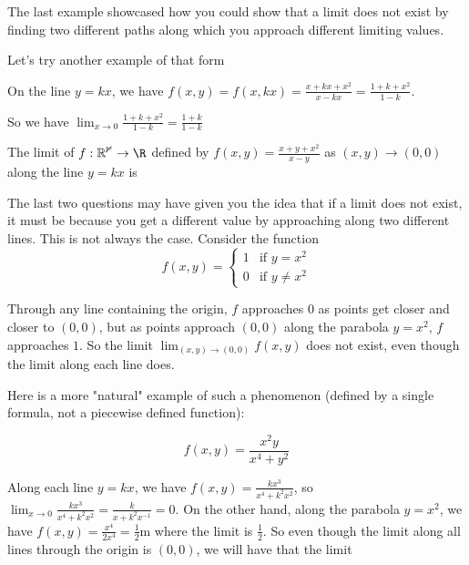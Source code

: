 \documentclass{ximera}
\begin{document}
	The last example showcased how you could show that a limit does not exist by finding two different paths along which you approach different limiting values.  
	
	Let's try another example of that form
	
	\begin{question}
		
	\begin{solution}
	\begin{hint}
		On the line $y=kx$, we have $f(x,y) = f(x,kx) = \frac{x+kx+x^2}{x-kx}  = \frac{1+k+x^2}{1-k }$.
	\end{hint}
	\begin{hint}
		So we have  $\lim_{x \to 0} \frac{1+k+x^2}{1-k} = \frac{1+k}{1-k}$ 
	\end{hint}
		The limit of $f: \mathbb{R^2} \to \R$ defined by $f(x,y) = \frac{x+y+x^2}{x-y}$ as $(x,y) \to (0,0)$ along the line $y=kx$ is 
	\end{solution}		
	\end{question}
	
	The last two questions may have given you the idea that if a limit does not exist, it must be because you get a different value by approaching along two different lines.  
	This is not always the case.  Consider the function
	\[f(x,y) = \begin{cases}
			1 & \text{if $y = x^2$}\\
			0 & \text{if $y \neq x^2$}
		 \end{cases}\]
		 
	Through any line containing the origin, $f$ approaches $0$ as points get closer and closer to $(0,0)$, but as points approach $(0,0)$ along the parabola 
	$y=x^2$, $f$ approaches $1$.  So the limit $\lim_{(x,y) \to (0,0)} f(x,y)$ does not exist, even though the limit along each line does.
	
	Here is a more "natural" example of such a phenomenon (defined by a single formula, not a piecewise defined function):
	
	\[
		f(x,y) = \frac{x^2y}{x^4+y^2}
	\]
	
	Along each line $y = kx$, we have $f(x,y) = \frac{kx^3}{x^4+k^2x^2}$, so $\lim_{x \to 0} \frac{kx^3}{x^4+k^2x^2} = \frac{k}{x+k^2x^{-1}} = 0$.  
	On the other hand, along the parabola $y=x^2$, we have $f(x,y) = \frac{x^4}{2x^4} = \frac{1}{2}$m where the limit is $\frac{1}{2}$.  So even though the limit
	along all lines through the origin is $(0,0)$, we will have that the limit 
	
	
	
	
	
	
\end{document}
